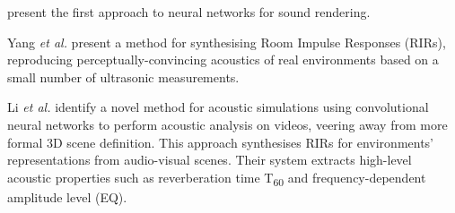 \cite{ratnarajah2022mesh2ir} present the first approach to neural networks for sound rendering.

Yang \textit{et al.} \cite{yang2020fast} present a method for synthesising Room Impulse Responses (RIRs), reproducing perceptually-convincing acoustics of real environments based on a small number of ultrasonic measurements.\par
Li \textit{et al.} \cite{li2018scene} identify a novel method for acoustic simulations using convolutional neural networks to perform acoustic analysis on videos, veering away from more formal 3D scene definition. This approach synthesises RIRs for environments' representations from audio-visual scenes. Their system extracts high-level acoustic properties such as reverberation time T\textsubscript{60} and frequency-dependent amplitude level (EQ).\par



